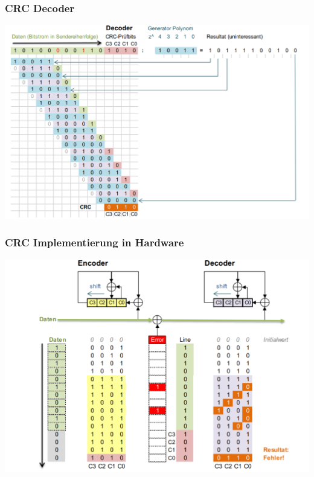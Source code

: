 \subsubsection{CRC Decoder}%
\label{ssub:crc_decoder}

\begin{center}
    \includegraphics[width=1\linewidth]{images/crcdecp.png}
\end{center}

\subsubsection{CRC Implementierung in Hardware}%
\label{ssub:crc_implementierung_in_hardware}

\begin{center}
    \includegraphics[width=1\linewidth]{images/crchard.png}
\end{center}

